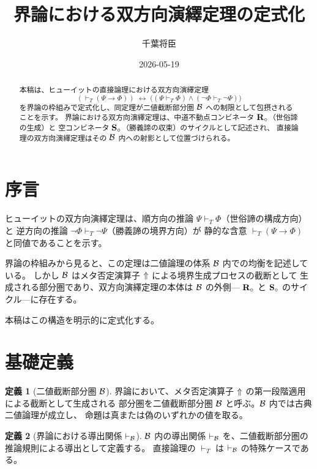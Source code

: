 \documentclass[11pt,a4paper]{ltjsarticle}
\theoremstyle{definition}
\newtheorem{definition}{定義}[section]
\begin{document}
\title{界論における双方向演繹定理の定式化}
\author{千葉将臣}
\date{2026-05-19}
\maketitle

\begin{abstract}
本稿は、ヒューイットの直接論理における双方向演繹定理
\[
(\vdash_T (\Psi \to \Phi))
\;\leftrightarrow\;
\bigl((\Psi \vdash_T \Phi) \land (\neg\Phi \vdash_T \neg\Psi)\bigr)
\]
を界論の枠組みで定式化し、同定理が二値截断部分圏 $\mathcal{B}$ への制限として包摂されることを示す。
界論における双方向演繹定理は、中道不動点コンビネータ $\mathbf{R}_{\circ}$（世俗諦の生成）と
空コンビネータ $\mathbf{S}_{\circ}$（勝義諦の収束）のサイクルとして記述され、
直接論理の双方向演繹定理はその $\mathcal{B}$ 内への射影として位置づけられる。
\end{abstract}

\section{序言}

ヒューイットの双方向演繹定理は、順方向の推論
$\Psi \vdash_T \Phi$（世俗諦の構成方向）と
逆方向の推論 $\neg\Phi \vdash_T \neg\Psi$（勝義諦の境界方向）が
静的な含意 $\vdash_T (\Psi \to \Phi)$ と同値であることを示す。

界論の枠組みから見ると、この定理は二値論理の体系 $\mathcal{B}$ 内での均衡を記述している。
しかし $\mathcal{B}$ はメタ否定演算子 $\Uparrow$ による境界生成プロセスの截断として
生成される部分圏であり、双方向演繹定理の本体は $\mathcal{B}$ の外側---
$\mathbf{R}_{\circ}$ と $\mathbf{S}_{\circ}$ のサイクル---に存在する。

本稿はこの構造を明示的に定式化する。

\section{基礎定義}

\begin{definition}[二値截断部分圏 $\mathcal{B}$]
界論において、メタ否定演算子 $\Uparrow$ の第一段階適用による截断として生成される
部分圏を二値截断部分圏 $\mathcal{B}$ と呼ぶ。$\mathcal{B}$ 内では古典二値論理が成立し、
命題は真または偽のいずれかの値を取る。
\end{definition}

\begin{definition}[界論における導出関係 $\vdash_{\mathcal{B}}$]
$\mathcal{B}$ 内の導出関係 $\vdash_{\mathcal{B}}$ を、二値截断部分圏の推論規則による導出として定義する。
直接論理の $\vdash_T$ は $\vdash_{\mathcal{B}}$ の特殊ケースである。
\end{definition}
\end{document}
